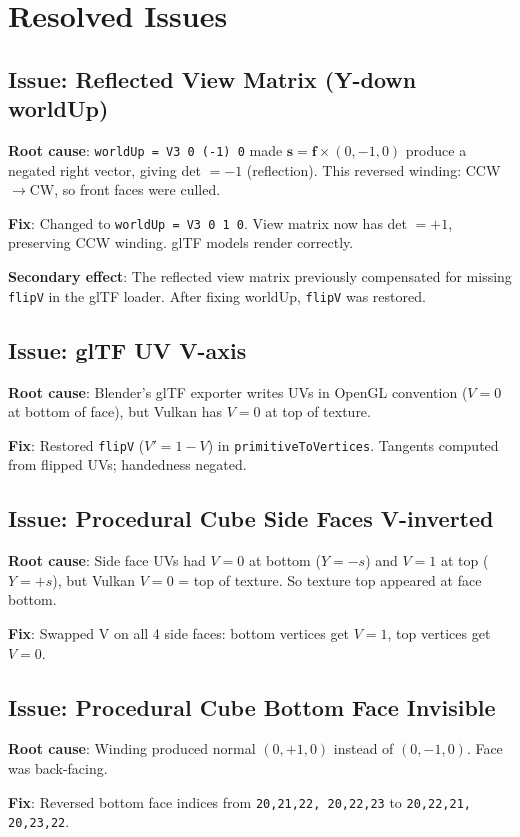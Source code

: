 \documentclass{article}
\begin{document}
\section{Resolved Issues}

\subsection{Issue: Reflected View Matrix (Y-down worldUp)}
\textbf{Root cause}: \texttt{worldUp = V3 0 (-1) 0} made $\mathbf{s} = \mathbf{f} \times (0,-1,0)$ produce a negated right vector, giving det $= -1$ (reflection). This reversed winding: CCW$\to$CW, so front faces were culled.

\textbf{Fix}: Changed to \texttt{worldUp = V3 0 1 0}. View matrix now has det $= +1$, preserving CCW winding. glTF models render correctly.

\textbf{Secondary effect}: The reflected view matrix previously compensated for missing \texttt{flipV} in the glTF loader. After fixing worldUp, \texttt{flipV} was restored.

\subsection{Issue: glTF UV V-axis}
\textbf{Root cause}: Blender's glTF exporter writes UVs in OpenGL convention ($V=0$ at bottom of face), but Vulkan has $V=0$ at top of texture.

\textbf{Fix}: Restored \texttt{flipV} ($V' = 1 - V$) in \texttt{primitiveToVertices}. Tangents computed from flipped UVs; handedness negated.

\subsection{Issue: Procedural Cube Side Faces V-inverted}
\textbf{Root cause}: Side face UVs had $V=0$ at bottom ($Y=-s$) and $V=1$ at top ($Y=+s$), but Vulkan $V=0$ = top of texture. So texture top appeared at face bottom.

\textbf{Fix}: Swapped V on all 4 side faces: bottom vertices get $V=1$, top vertices get $V=0$.

\subsection{Issue: Procedural Cube Bottom Face Invisible}
\textbf{Root cause}: Winding produced normal $(0,+1,0)$ instead of $(0,-1,0)$. Face was back-facing.

\textbf{Fix}: Reversed bottom face indices from \texttt{20,21,22, 20,22,23} to \texttt{20,22,21, 20,23,22}.
\end{document}
